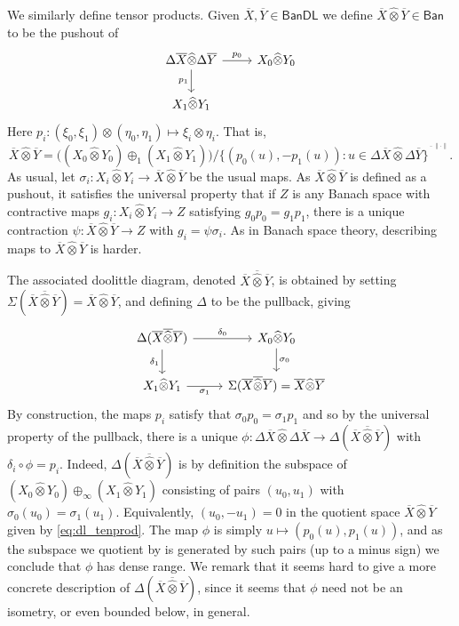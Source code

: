 \documentclass[a4paper,11pt]{article}
\theoremstyle{plain}
\theoremstyle{remark}
\newcommand{\msf}[1]{\mathsf{#1}}
\newcommand{\proten}{\widehat\otimes}
\begin{document}
We similarly define tensor products.  Given $\overline X,\overline Y \in \msf{BanDL}$ we define $\overline X \proten \overline Y \in \msf{Ban}$ to be the pushout of
\[ \begin{tikzcd}
  \Delta\overline X \proten \Delta\overline Y \arrow[r, "p_0"] \arrow[d, "p_1"'] & X_0 \proten Y_0 \\ X_1\proten Y_1
\end{tikzcd} \]
Here $p_i \colon (\xi_0,\xi_1) \otimes (\eta_0,\eta_1) \mapsto \xi_i \otimes \eta_i$.  That is,
\begin{equation} \overline X \proten \overline Y = \big(  (X_0 \proten Y_0) \oplus_1 ( X_1 \proten Y_1) \big) / \big\{ (p_0(u), -p_1(u)) : u \in \Delta\overline X \proten \Delta\overline Y \big\}^{\overline{\phantom{x}}^{\|\cdot\|}}. \label{eq:dl_tenprod}
\end{equation}
As usual, let $\sigma_i \colon X_i\proten Y_i \to \overline X \proten \overline Y$ be the usual maps.  As $\overline X \proten \overline Y$ is defined as a pushout, it satisfies the universal property that if $Z$ is any Banach space with contractive maps $g_i \colon X_i\proten Y_i \to Z$ satisfying $g_0p_0 = g_1p_1$, there is a unique contraction $\psi \colon \overline X\proten\overline Y \to Z$ with $g_i = \psi \sigma_i$.  As in Banach space theory, describing maps to $\overline X \proten \overline Y$ is harder.

The associated doolittle diagram, denoted $\overline X \overline{\proten} \overline Y$, is obtained by setting $\Sigma(\overline X \overline{\proten} \overline Y) = \overline X \proten \overline Y$, and defining $\Delta$ to be the pullback, giving
\begin{equation} \begin{tikzcd}
\Delta(\overline X \overline{\proten} \overline Y) \arrow[r, "\delta_0"] \arrow[d, "\delta_1"'] & X_0 \proten Y_0 \arrow[d, "\sigma_0"] \\ X_1\proten Y_1 \arrow[r, "\sigma_1"'] & \Sigma(\overline X \overline{\proten} \overline Y) = \overline X \proten \overline Y
\end{tikzcd}
\label{eq:tenprod_full_dl}
\end{equation}
By construction, the maps $p_i$ satisfy that $\sigma_0p_0 = \sigma_1p_1$ and so by the universal property of the pullback, there is a unique $\phi \colon \Delta\overline X \proten \Delta\overline X \to \Delta(\overline X \overline\proten \overline Y)$ with $\delta_i \circ \phi = p_i$.  Indeed, $\Delta(\overline X \overline\proten \overline Y)$ is by definition the subspace of $(X_0\proten Y_0)\oplus_\infty(X_1\proten Y_1)$ consisting of pairs $(u_0,u_1)$ with $\sigma_0(u_0) = \sigma_1(u_1)$.  Equivalently, $(u_0, -u_1) = 0$ in the quotient space $\overline X \proten \overline Y$ given by \eqref{eq:dl_tenprod}.  The map $\phi$ is simply $u\mapsto (p_0(u), p_1(u))$, and as the subspace we quotient by is generated by such pairs (up to a minus sign) we conclude that $\phi$ has dense range.  We remark that it seems hard to give a more concrete description of $\Delta(\overline X \overline{\proten} \overline Y)$, since it seems that $\phi$ need not be an isometry, or even bounded below, in general.
\end{document}
